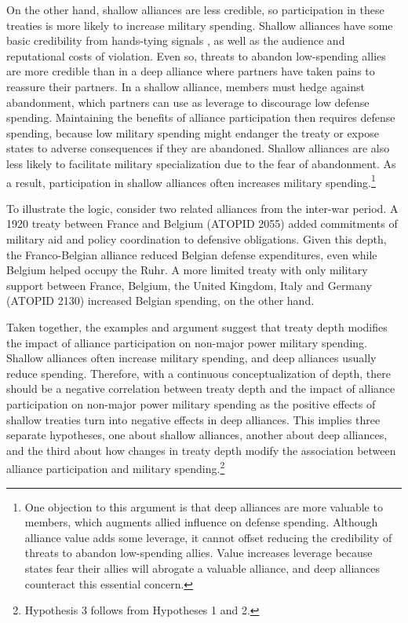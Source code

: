 \documentclass[12pt]{article}
\begin{document}
On the other hand, shallow alliances are less credible, so participation in these treaties is more likely to increase military spending. 
Shallow alliances have some basic credibility from hands-tying signals \citep{Fearon1997}, as well as the audience \citep{Morrow2000} and reputational \citep{Gibler2008, Crescenzietal2012} costs of violation.
Even so, threats to abandon low-spending allies are more credible than in a deep alliance where partners have taken pains to reassure their partners.  
In a shallow alliance, members must hedge against abandonment, which partners can use as leverage to discourage low defense spending. 
Maintaining the benefits of alliance participation then requires defense spending, because low military spending might endanger the treaty or expose states to adverse consequences if they are abandoned. 
Shallow alliances are also less likely to facilitate military specialization due to the fear of abandonment. 
As a result, participation in shallow alliances often increases military spending.\footnote{
One objection to this argument is that deep alliances are more valuable to members, which augments allied influence on defense spending. 
Although alliance value adds some leverage, it cannot offset reducing the credibility of threats to abandon low-spending allies.
Value increases leverage because states fear their allies will abrogate a valuable alliance, and deep alliances counteract this essential concern. 
}


To illustrate the logic, consider two related alliances from the inter-war period. 
A 1920 treaty between France and Belgium (ATOPID 2055) added commitments of military aid and policy coordination to defensive obligations. 
Given this depth, the Franco-Belgian alliance reduced Belgian defense expenditures, even while Belgium helped occupy the Ruhr. 
A more limited treaty with only military support between France, Belgium, the United Kingdom, Italy and Germany (ATOPID 2130) increased Belgian spending, on the other hand.   
 
 
Taken together, the examples and argument suggest that treaty depth modifies the impact of alliance participation on non-major power military spending. 
Shallow alliances often increase military spending, and deep alliances usually reduce spending.  
Therefore, with a continuous conceptualization of depth, there should be a negative correlation between treaty depth and the impact of alliance participation on non-major power military spending as the positive effects of shallow treaties turn into negative effects in deep alliances. 
This implies three separate hypotheses, one about shallow alliances, another about deep alliances, and the third about how changes in treaty depth modify the association between alliance participation and military spending.\footnote{Hypothesis 3 follows from Hypotheses 1 and 2.}
 
\end{document}
